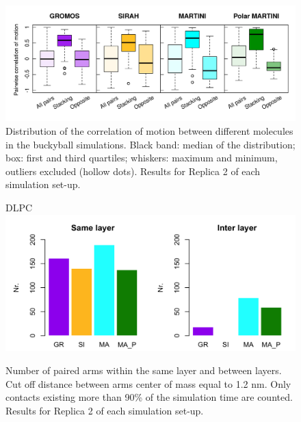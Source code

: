 \begin{figure}[t]
\centering
\includegraphics[width=0.95\linewidth]{3results_capsule/pics/R2_RKGBcorr_boxplot_all.png} 
\caption[(SI) Replica 2: Correlation of motion between molecules of the buckyball]{Distribution of the correlation of motion between different molecules in the buckyball simulations. Black band: median of the distribution; box: first and third quartiles; whiskers: maximum and minimum, outliers excluded (hollow dots). Results for Replica 2 of each simulation set-up.}
\label{fig:BTI_corr2}
\end{figure}

\begin{figure}[t!]DLPC​
\centering
\includegraphics[width=0.85\linewidth]{3results_capsule/pics/R2_stAll_beta_90_R1.png}
\caption[(SI) Replica 2: Arm pairing during simulations of the buckyball]{Number of paired arms within the same layer and between layers. Cut off distance between arms center of mass equal to 1.2 nm. Only contacts existing more than 90\% of the simulation time are counted. Results for Replica 2 of each simulation set-up.}
\label{fig:BTI_beta2}
\end{figure}

